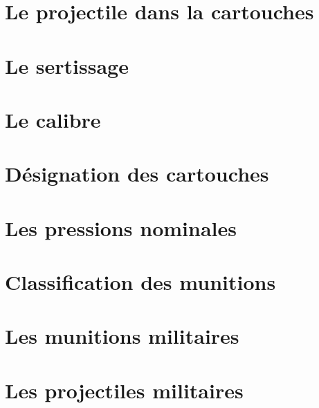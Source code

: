     \chapter{Le projectile dans la cartouches}
    \label{chap:projectile_cartouche}
    

    \chapter{Le sertissage}
    \label{chap:sertissage}
    

    \chapter{Le calibre}
    \label{chap:calibre}
    

    \chapter{Désignation des cartouches}
    \label{chap:designation_cartouches}
    

    \chapter{Les pressions nominales}
    \label{chap:pressions_nominales}
    

    \chapter{Classification des munitions}
    \label{chap:classification_munitions}
    

    \chapter{Les munitions militaires}
    \label{chap:munitions_militaires}
    

    \chapter{Les projectiles militaires}
    \label{chap:projectiles_militaires}
    

